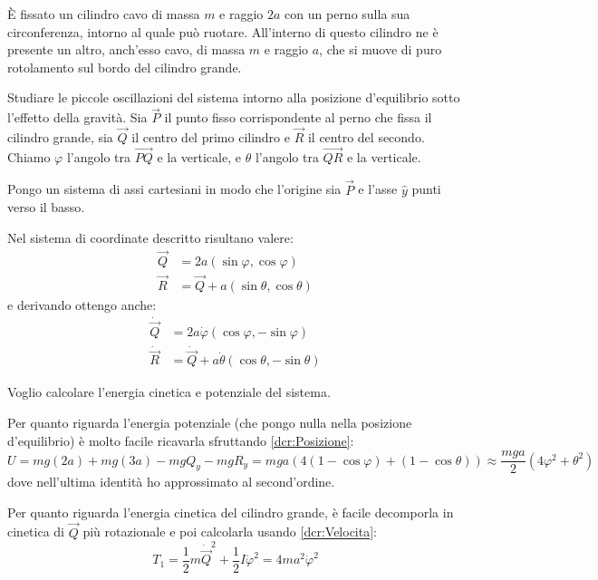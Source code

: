 \documentclass[../main.tex]{subfiles}
\begin{document}
\textex
È fissato un cilindro cavo di massa $m$ e raggio $2a$ con un perno sulla sua circonferenza, intorno al quale può ruotare.
All'interno di questo cilindro ne è presente un altro, anch'esso cavo, di massa $m$ e raggio $a$, che si muove di puro rotolamento sul bordo del cilindro grande.

Studiare le piccole oscillazioni del sistema intorno alla posizione d'equilibrio sotto l'effetto della gravità.
\solution
Sia $\vec P$ il punto fisso corrispondente al perno che fissa il cilindro grande, sia $\vec Q$ il centro del primo cilindro e $\vec R$ il centro del secondo. Chiamo $\varphi$ l'angolo tra $\overrightarrow{PQ}$ e la verticale, e $\theta$ l'angolo tra $\overrightarrow{QR}$ e la verticale.

Pongo un sistema di assi cartesiani in modo che l'origine sia $\vec P$ e l'asse $\hat y$ punti verso il basso.

Nel sistema di coordinate descritto risultano valere:
\begin{equation}\begin{split}\label{dcr:Posizione}
	\vec Q&=2a(\sin\varphi,\cos\varphi) \\
	\vec R&=\vec Q + a(\sin\theta,\cos\theta)
\end{split}\end{equation}
e derivando ottengo anche:
\begin{equation}\begin{split}\label{dcr:Velocita}
	\dot{\vec Q}&=2a\dot{\varphi}(\cos\varphi,-\sin\varphi) \\
	\dot{\vec R}&=\dot{\vec Q} + a\dot{\theta}(\cos\theta,-\sin\theta)
\end{split}\end{equation}

Voglio calcolare l'energia cinetica e potenziale del sistema.

Per quanto riguarda l'energia potenziale (che pongo nulla nella posizione d'equilibrio) è molto facile ricavarla sfruttando \cref{dcr:Posizione}:
\begin{equation}\label{dcr:Potenziale}
	U=mg(2a)+mg(3a)-mgQ_y-mgR_y=mga\left(4(1-\cos\varphi)+(1-\cos\theta)\right)
	\approx \frac{mga}2\left(4\varphi^2+\theta^2\right)
\end{equation}
dove nell'ultima identità ho approssimato al second'ordine.

Per quanto riguarda l'energia cinetica del cilindro grande, è facile decomporla in cinetica di $\vec Q$ più rotazionale e poi calcolarla usando \cref{dcr:Velocita}:
\begin{equation}\label{dcr:Cinetica1}
	T_1=\frac 12 m {\dot{\vec Q}}^2+\frac 12I{\dot\varphi}^2=4ma^2\dot\varphi^2
\end{equation}
\end{document}
